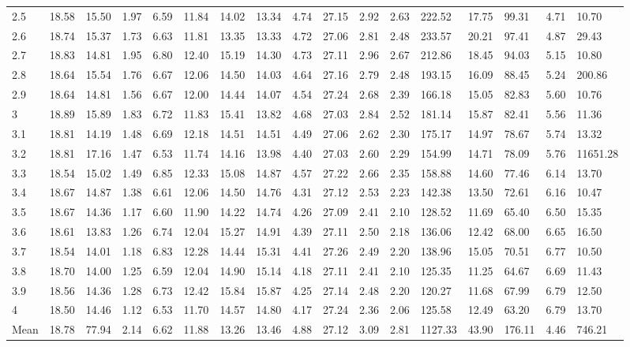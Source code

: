 \begin{adjustbox}{angle=90}
\begin{center}
\begin{tabular}{|l|llllllllllllllll|}
2.5&18.58&15.50&1.97&6.59&11.84&14.02&13.34&4.74&27.15&2.92&2.63&222.52&17.75&99.31&4.71&10.70  \\ 
2.6&18.74&15.37&1.73&6.63&11.81&13.35&13.33&4.72&27.06&2.81&2.48&233.57&20.21&97.41&4.87&29.43  \\ 
2.7&18.83&14.81&1.95&6.80&12.40&15.19&14.30&4.73&27.11&2.96&2.67&212.86&18.45&94.03&5.15&10.80  \\ 
2.8&18.64&15.54&1.76&6.67&12.06&14.50&14.03&4.64&27.16&2.79&2.48&193.15&16.09&88.45&5.24&200.86  \\ 
2.9&18.64&14.81&1.56&6.67&12.00&14.44&14.07&4.54&27.24&2.68&2.39&166.18&15.05&82.83&5.60&10.76  \\ 
3&18.89&15.89&1.83&6.72&11.83&15.41&13.82&4.68&27.03&2.84&2.52&181.14&15.87&82.41&5.56&11.36  \\ 
3.1&18.81&14.19&1.48&6.69&12.18&14.51&14.51&4.49&27.06&2.62&2.30&175.17&14.97&78.67&5.74&13.32  \\ 
3.2&18.81&17.16&1.47&6.53&11.74&14.16&13.98&4.40&27.03&2.60&2.29&154.99&14.71&78.09&5.76&11651.28  \\ 
3.3&18.54&15.02&1.49&6.85&12.33&15.08&14.87&4.57&27.22&2.66&2.35&158.88&14.60&77.46&6.14&13.70  \\ 
3.4&18.67&14.87&1.38&6.61&12.06&14.50&14.76&4.31&27.12&2.53&2.23&142.38&13.50&72.61&6.16&10.47  \\ 
3.5&18.67&14.36&1.17&6.60&11.90&14.22&14.74&4.26&27.09&2.41&2.10&128.52&11.69&65.40&6.50&15.35  \\ 
3.6&18.61&13.83&1.26&6.74&12.04&15.27&14.91&4.39&27.11&2.50&2.18&136.06&12.42&68.00&6.65&16.50  \\ 
3.7&18.54&14.01&1.18&6.83&12.28&14.44&15.31&4.41&27.26&2.49&2.20&138.96&15.05&70.51&6.77&10.50  \\ 
3.8&18.70&14.00&1.25&6.59&12.04&14.90&15.14&4.18&27.11&2.41&2.10&125.35&11.25&64.67&6.69&11.43  \\ 
3.9&18.56&14.36&1.28&6.73&12.42&15.84&15.87&4.25&27.14&2.48&2.20&120.27&11.68&67.99&6.79&12.50  \\ 
4 & 18.50&14.46&1.12&6.53&11.70&14.57&14.80&4.17&27.24&2.36&2.06&125.58&12.49&63.20&6.79&13.70  \\ \hline \hline
Mean & 18.78&77.94&2.14&6.62&11.88&13.26&13.46&4.88&27.12&3.09&2.81&1127.33&43.90&176.11&4.46&746.21  \\ \hline
\end{tabular}
\end{center}
\end{adjustbox}




